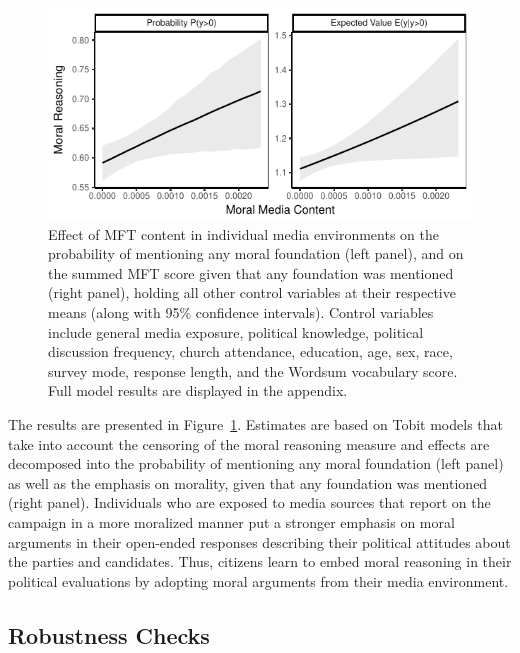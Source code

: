 \documentclass[12pt]{article}
\begin{document}
\begin{figure}[h]\centering
\includegraphics{../calc/fig/tobit_media.pdf}
\caption{Effect of MFT content in individual media environments on the probability of mentioning any moral foundation (left panel), and on the summed MFT score given that any foundation was mentioned (right panel), holding all other control variables at their respective means (along with 95\% confidence intervals). Control variables include general media exposure, political knowledge, political discussion frequency, church attendance, education, age, sex, race, survey mode, response length, and the Wordsum vocabulary score. Full model results are displayed in the appendix.
}\label{fig:tobit_media}
\end{figure}

The results are presented in Figure~\ref{fig:tobit_media}. Estimates are based on Tobit models that take into account the censoring of the moral reasoning measure and effects are decomposed into the probability of mentioning any moral foundation (left panel) as well as the emphasis on morality, given that any foundation was mentioned (right panel). Individuals who are exposed to media sources that report on the campaign in a more moralized manner put a stronger emphasis on moral arguments in their open-ended responses describing their political attitudes about the parties and candidates. Thus, citizens learn to embed moral reasoning in their political evaluations by adopting moral arguments from their media environment.



\subsection*{Robustness Checks}
\end{document}
